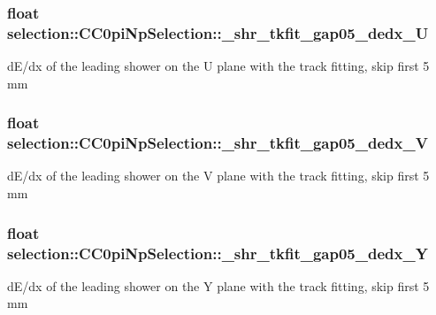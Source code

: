 \subsubsection[{\texorpdfstring{\+\_\+shr\+\_\+tkfit\+\_\+gap05\+\_\+dedx\+\_\+U}{_shr_tkfit_gap05_dedx_U}}]{\setlength{\rightskip}{0pt plus 5cm}float selection\+::\+C\+C0pi\+Np\+Selection\+::\+\_\+shr\+\_\+tkfit\+\_\+gap05\+\_\+dedx\+\_\+U\hspace{0.3cm}{\ttfamily [private]}}\hypertarget{classselection_1_1CC0piNpSelection_ad0504ef7cf7c8fa5a0059fbaedd6861b}{}\label{classselection_1_1CC0piNpSelection_ad0504ef7cf7c8fa5a0059fbaedd6861b}
d\+E/dx of the leading shower on the U plane with the track fitting, skip first 5 mm 
\subsubsection[{\texorpdfstring{\+\_\+shr\+\_\+tkfit\+\_\+gap05\+\_\+dedx\+\_\+V}{_shr_tkfit_gap05_dedx_V}}]{\setlength{\rightskip}{0pt plus 5cm}float selection\+::\+C\+C0pi\+Np\+Selection\+::\+\_\+shr\+\_\+tkfit\+\_\+gap05\+\_\+dedx\+\_\+V\hspace{0.3cm}{\ttfamily [private]}}\hypertarget{classselection_1_1CC0piNpSelection_a711b325a6f6cb77db530eb21e1c99fc0}{}\label{classselection_1_1CC0piNpSelection_a711b325a6f6cb77db530eb21e1c99fc0}
d\+E/dx of the leading shower on the V plane with the track fitting, skip first 5 mm 
\subsubsection[{\texorpdfstring{\+\_\+shr\+\_\+tkfit\+\_\+gap05\+\_\+dedx\+\_\+Y}{_shr_tkfit_gap05_dedx_Y}}]{\setlength{\rightskip}{0pt plus 5cm}float selection\+::\+C\+C0pi\+Np\+Selection\+::\+\_\+shr\+\_\+tkfit\+\_\+gap05\+\_\+dedx\+\_\+Y\hspace{0.3cm}{\ttfamily [private]}}\hypertarget{classselection_1_1CC0piNpSelection_a82a0f0efca7cceee176b7058001073a6}{}\label{classselection_1_1CC0piNpSelection_a82a0f0efca7cceee176b7058001073a6}
d\+E/dx of the leading shower on the Y plane with the track fitting, skip first 5 mm 
